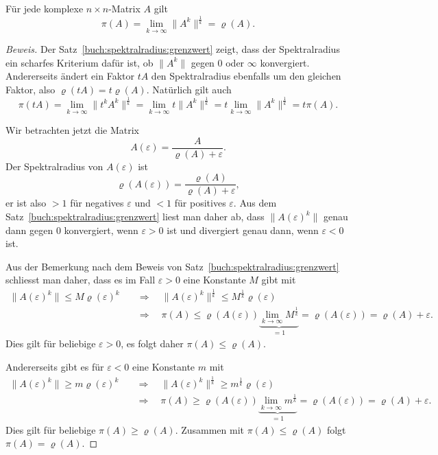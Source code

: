 \begin{satz}[Gelfand]
Für jede komplexe $n\times n$-Matrix $A$ gilt
\[
\pi(A)
=
\lim_{k\to\infty}\|A^k\|^\frac1k
=
\varrho(A).
\]
\end{satz}

\begin{proof}[Beweis]
Der Satz~\ref{buch:spektralradius:grenzwert} zeigt, dass der
Spektralradius ein scharfes Kriterium dafür ist, ob $\|A^k\|$ 
gegen 0 oder $\infty$ konvergiert.
Andererseits ändert ein Faktor $tA$ den Spektralradius ebenfalls um
den gleichen Faktor, also $\varrho(tA)=t\varrho(A)$.
Natürlich gilt auch
\[
\pi(tA)
=
\lim_{k\to\infty} \|t^kA^k\|^\frac1k
=
\lim_{k\to\infty} t\|A^k\|^\frac1k
=
t\lim_{k\to\infty} \|A^k\|^\frac1k
=
t\pi(A).
\]

Wir betrachten jetzt die Matrix
\[
A(\varepsilon) = \frac{A}{\varrho(A) + \varepsilon}.
\]
Der Spektralradius von $A(\varepsilon)$ ist
\[
\varrho(A(\varepsilon)) = \frac{\varrho(A)}{\varrho(A)+\varepsilon},
\]
er ist also $>1$ für negatives $\varepsilon$ und $<1$ für positives
$\varepsilon$.
Aus dem Satz~\ref{buch:spektralradius:grenzwert} liest man daher ab,
dass $\|A(\varepsilon)^k\|$ genau dann gegen $0$ konvergiert, wenn
$\varepsilon > 0$ ist und divergiert genau dann, wenn $\varepsilon< 0$ ist.

Aus der Bemerkung nach dem Beweis von
Satz~\ref{buch:spektralradius:grenzwert} schliesst man daher, dass 
es im Fall $\varepsilon > 0$ eine Konstante $M$ gibt mit
\begin{align*}
\|A(\varepsilon) ^k\|\le M\varrho(\varepsilon)^k
\quad&\Rightarrow\quad
\|A(\varepsilon) ^k\|^\frac1k\le M^\frac1k\varrho(\varepsilon)
\\
&\Rightarrow\quad
\pi(A) \le  \varrho(A(\varepsilon))
\underbrace{\lim_{k\to\infty} M^\frac1k}_{\displaystyle=1}
=
\varrho(A(\varepsilon))
=
\varrho(A)+\varepsilon.
\end{align*}
Dies gilt für beliebige $\varepsilon >0$, es folgt daher
$\pi(A) \le \varrho(A)$.

Andererseits gibt es für $\varepsilon <0$ eine Konstante $m$ mit
\begin{align*}
\|A(\varepsilon) ^k\|\ge m\varrho(\varepsilon)^k
\quad&\Rightarrow\quad
\|A(\varepsilon) ^k\|^\frac1k\ge m^\frac1k\varrho(\varepsilon)
\\
&\Rightarrow\quad
\pi(A) \ge  \varrho(A(\varepsilon))
\underbrace{\lim_{k\to\infty} m^\frac1k}_{\displaystyle=1}
=
\varrho(A(\varepsilon))
=
\varrho(A)+\varepsilon.
\end{align*}
Dies gilt für beliebige $\pi(A) \ge \varrho(A)$.
Zusammen mit $\pi(A) \le \varrho(A)$ folgt $\pi(A)=\varrho(A)$.
\end{proof}

